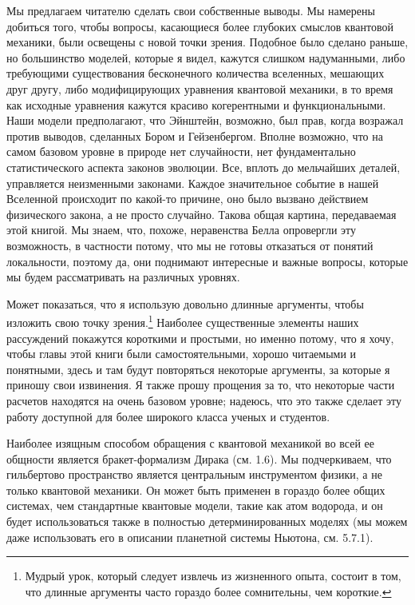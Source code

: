 \documentclass[main.tex]{subfiles}
\begin{document}
Мы предлагаем читателю сделать свои собственные выводы. Мы намерены добиться того, чтобы вопросы, касающиеся более глубоких смыслов квантовой механики, были освещены с новой точки зрения. Подобное было сделано раньше, но большинство моделей, которые я видел, кажутся слишком надуманными, либо требующими существования бесконечного количества вселенных, мешающих друг другу, либо модифицирующих уравнения квантовой механики, в то время как исходные уравнения кажутся красиво когерентными и функциональными. Наши модели предполагают, что Эйнштейн, возможно, был прав, когда возражал против выводов, сделанных Бором и Гейзенбергом. Вполне возможно, что на самом базовом уровне в природе нет случайности, нет фундаментально статистического аспекта законов эволюции. Все, вплоть до мельчайших деталей, управляется неизменными законами. Каждое значительное событие в нашей Вселенной происходит по какой-то причине, оно было вызвано действием физического закона, а не просто случайно. Такова общая картина, передаваемая этой книгой. Мы знаем, что, похоже, неравенства Белла опровергли эту возможность, в частности потому, что мы не готовы отказаться от понятий локальности, поэтому да, они поднимают интересные и важные вопросы, которые мы будем рассматривать на различных уровнях. 

Может показаться, что я использую довольно длинные аргументы, чтобы изложить свою точку зрения.\footnote{Мудрый урок, который следует извлечь из жизненного опыта, состоит в том, что длинные аргументы часто гораздо более сомнительны, чем короткие.} Наиболее существенные элементы наших рассуждений покажутся короткими и простыми, но именно потому, что я хочу, чтобы главы этой книги были самостоятельными, хорошо читаемыми и понятными, здесь и там будут повторяться некоторые аргументы, за которые я приношу свои извинения. Я также прошу прощения за то, что некоторые части расчетов находятся на очень базовом уровне; надеюсь, что это также сделает эту работу доступной для более широкого класса ученых и студентов. 

Наиболее изящным способом обращения с квантовой механикой во всей ее общности является бракет-формализм Дирака (см. 1.6). Мы подчеркиваем, что гильбертово пространство является центральным инструментом физики, а не только квантовой механики. Он может быть применен в гораздо более общих системах, чем стандартные квантовые модели, такие как атом водорода, и он будет использоваться также в полностью детерминированных моделях (мы можем даже использовать его в описании планетной системы Ньютона, см. 5.7.1). 
\end{document}
